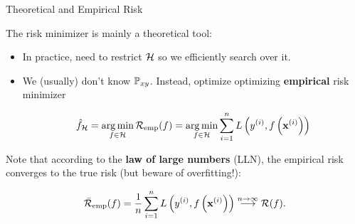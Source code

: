 \documentclass[11pt,compress,t,notes=noshow, xcolor=table]{beamer}
\begin{document}
\begin{vbframe}{Theoretical and Empirical Risk}  
 

The risk minimizer is mainly a theoretical tool: 

\begin{itemize}
	\item In practice, need to restrict $\mathcal{H}$ so we efficiently search over it. 
	\item We (usually) don't know $\mathbb{P}_{xy}$. Instead, optimize optimizing \textbf{empirical} risk minimizer

	\begin{eqnarray*}
		{\hat f}_{\mathcal{H}} = \mathop{\mathrm{arg\,min}}_{f \in \mathcal{H}} \mathcal{R}_{\text{emp}}(f) = \mathop{\mathrm{arg\,min}}_{f \in \mathcal{H}} \sum\limits_{i=1}^n L\left(y^{(i)}, f\left(\mathbf{x}^{(i)}\right)\right)
	\end{eqnarray*}

\end{itemize}

Note that according to the \textbf{law of large numbers} (LLN), the empirical risk converges to the true risk (but beware of overfitting!): 

\begin{eqnarray*}
	\bar{\mathcal{R}}_\text{emp}(f) = \frac{1}{n} \sum\limits_{i=1}^n L\left(y^{(i)}, f\left(\mathbf{x}^{(i)}\right)\right) \overset{n \to \infty}{\longrightarrow} \mathcal{R}(f). 
\end{eqnarray*}

\end{vbframe}
\end{document}
